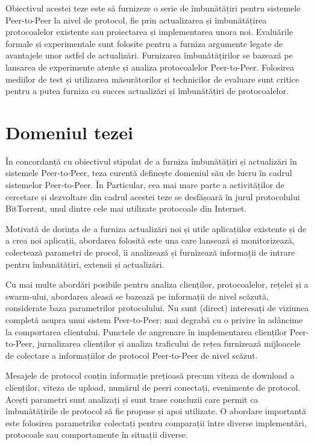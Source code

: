 Obiectivul acestei teze este să furnizeze o serie de îmbunătățiri pentru
sistemele Peer-to-Peer la nivel de protocol, fie prin actualizarea și
îmbunătățirea protocoalelor existente sau proiectarea și implementarea unora
noi. Evaluările formale și experimentale sunt folosite pentru a furniza
argumente legate de avantajele unor astfel de actualizări. Furnizarea
îmbunătățirilor se bazează pe lansarea de experimente atente și analiza
protocoalelor Peer-to-Peer. Folosirea mediilor de test și utilizarea
măsurătorilor și technicilor de evaluare sunt critice pentru a putea furniza
cu succes actualizări și îmbunătățiri de protocoalelor.

\section{Domeniul tezei}
\label{sec:intro:scope}

În concordanță cu obiectivul stipulat de a furniza îmbunătățiri și actualizări
în sistemele Peer-to-Peer, teza curentă definește domeniul său de lucru în
cadrul sistemelor Peer-to-Peer. În Particular, cea mai mare parte a
activităților de cercetare și dezvoltare din cadrul acestei teze se desfășoară
în jurul protocolului BitTorrent, unul dintre cele mai utilizate protocoale
din Internet.

Motivată de dorința de a furniza actualizări noi și utile aplicațiilor
existente și de a crea noi aplicații, abordarea folosită este una care
lansează și monitorizează, colectează parametri de procol, îi analizează și
furnizează informații de intrare pentru îmbunătățiri, extensii și actualizări.

Cu mai multe abordări posibile pentru analiza clienților, protocoalelor,
rețelei și a swarm-ului, abordarea aleasă se bazează pe informații de nivel
scăzută, considerate baza parametrilor protocolului. Nu sunt (direct)
interesați de viziunea completă asupra unui sistem Peer-to-Peer; mai degrabă
cu o privire în adâncime la comportarea clientului. Punctele de angrenare în
implementarea clienților Peer-to-Peer, jurnalizarea clienților și analiza
traficului de rețea furnizează mijloacele de colectare a informațiilor de
protocol Peer-to-Peer de nivel scăzut.

Mesajele de protocol conțin informație prețioasă precum viteza de download a
clienților, viteza de upload, numărul de peeri conectați, evenimente de
protocol. Acești parametri sunt analizați și sunt trase concluzii care permit
ca îmbunătățirile de protocol să fie propuse și apoi utilizate. O abordare
importantă este folosirea parametrilor colectați pentru comparații între
diverse implementări, protocoale sau comportamente în situații diverse.

